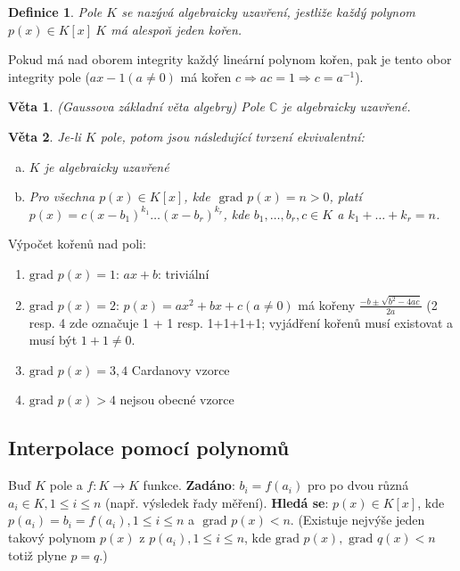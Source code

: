 \documentclass[a4paper, 11pt]{report}
\newtheorem{mydef}{Definice}[chapter]
\newtheorem{veta}{Věta}[chapter]
\begin{document}
\begin{mydef}
Pole $K$ se nazývá algebraicky uzavření, jestliže každý polynom $p(x) \in K[x] \ K$ má alespoň jeden kořen.
\end{mydef}
Pokud má nad oborem integrity každý lineární polynom kořen, pak je tento obor integrity pole ($ax - 1 (a \not=0)$ má kořen $c \Rightarrow ac = 1 \Rightarrow c = a^{-1}$).

\begin{veta}
(Gaussova základní věta algebry) Pole $\mathbb{C}$ je algebraicky uzavřené.
\end{veta}

\begin{veta}
Je-li $K$ pole, potom jsou následující tvrzení ekvivalentní:
\begin{enumerate}[a)]
	\item $K$ je algebraicky uzavřené
	\item Pro všechna $p(x) \in K[x]$, kde $\text{ grad } p(x) = n > 0$, platí $p(x) = c(x - b_1)^{k_1} \dots (x - b_r)^{k_r}$, kde $b_1, \dots, b_r, c \in K$ a $k_1 + \dots + k_r = n$.
\end{enumerate}
\end{veta}

Výpočet kořenů nad poli:
\begin{enumerate}[1)]
	\item $\text{grad } p(x) = 1$: $ax + b$:  triviální
	\item $\text{grad } p(x) = 2$: $p(x) = ax^2 + bx + c (a \not= 0)$ má kořeny $\frac{-b \pm \sqrt{b^2 - 4ac}}{2a}$ (2 resp. 4 zde označuje 1 + 1 resp. 1+1+1+1; vyjádření kořenů musí existovat a musí být $1+1 \not= 0$.
	\item $\text{grad } p(x) = 3, 4$ Cardanovy vzorce
	\item $\text{grad } p(x) > 4$  nejsou obecné vzorce
\end{enumerate}

\subsection{Interpolace pomocí polynomů}
Buď $K$ pole a $f: K \to K$ funkce. \textbf{Zadáno}: $b_i = f(a_i)$  pro po dvou různá $a_i \in K, 1 \leq i \leq n$ (např. výsledek řady měření). \textbf{Hledá se}: $p(x) \in K[x]$, kde $p(a_i) = b_i = f(a_i), 1 \leq i \leq n$ a $\text{ grad } p(x) < n$. (Existuje nejvýše jeden takový polynom $p(x)$ z $p(a_i), 1 \leq i \leq n$, kde $\text{grad } p(x), \text{ grad } q(x) < n$ totiž plyne $p = q$.)
\end{document}
